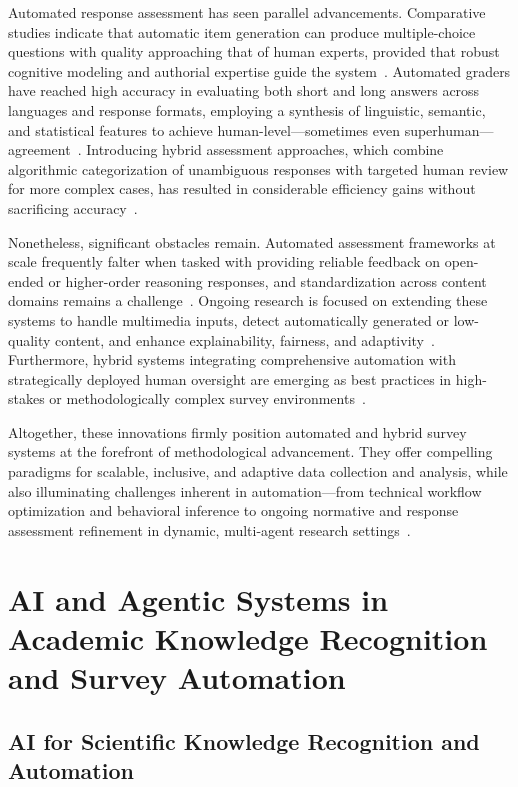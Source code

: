 \documentclass[sigconf]{acmart}
\begin{document}
Automated response assessment has seen parallel advancements. Comparative studies indicate that automatic item generation can produce multiple-choice questions with quality approaching that of human experts, provided that robust cognitive modeling and authorial expertise guide the system~\cite{ref2}. Automated graders have reached high accuracy in evaluating both short and long answers across languages and response formats, employing a synthesis of linguistic, semantic, and statistical features to achieve human-level—sometimes even superhuman—agreement~\cite{ref50,ref90}. Introducing hybrid assessment approaches, which combine algorithmic categorization of unambiguous responses with targeted human review for more complex cases, has resulted in considerable efficiency gains without sacrificing accuracy~\cite{ref86,ref88}.

Nonetheless, significant obstacles remain. Automated assessment frameworks at scale frequently falter when tasked with providing reliable feedback on open-ended or higher-order reasoning responses, and standardization across content domains remains a challenge~\cite{ref1,ref2,ref44,ref50}. Ongoing research is focused on extending these systems to handle multimedia inputs, detect automatically generated or low-quality content, and enhance explainability, fairness, and adaptivity~\cite{ref97,ref104,ref40,ref39,ref84}. Furthermore, hybrid systems integrating comprehensive automation with strategically deployed human oversight are emerging as best practices in high-stakes or methodologically complex survey environments~\cite{ref88,ref50,ref72}.

Altogether, these innovations firmly position automated and hybrid survey systems at the forefront of methodological advancement. They offer compelling paradigms for scalable, inclusive, and adaptive data collection and analysis, while also illuminating challenges inherent in automation—from technical workflow optimization and behavioral inference to ongoing normative and response assessment refinement in dynamic, multi-agent research settings~\cite{ref1,ref2,ref3,ref17,ref18,ref39,ref40,ref44,ref48,ref50,ref72,ref84,ref86,ref88,ref89,ref90,ref96,ref97,ref104,ref117}.

\section{AI and Agentic Systems in Academic Knowledge Recognition and Survey Automation}

\subsection{AI for Scientific Knowledge Recognition and Automation}
\end{document}
